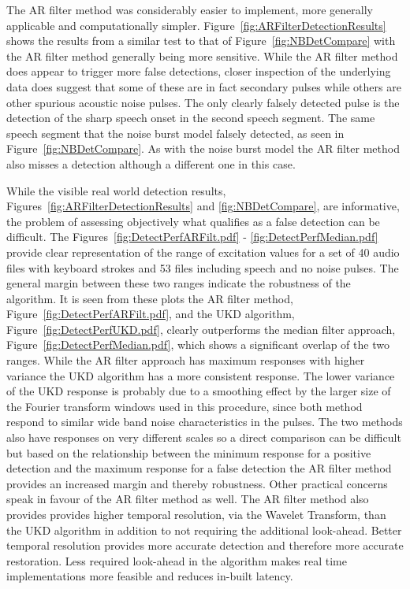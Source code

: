 The AR filter method was considerably easier to implement, more generally applicable and computationally simpler. Figure~\ref{fig:ARFilterDetectionResults} shows the results from a similar test to that of Figure~\ref{fig:NBDetCompare} with the AR filter method generally being more sensitive. While the AR filter method does appear to trigger more false detections, closer inspection of the underlying data does suggest that some of these are in fact secondary pulses while others are other spurious acoustic noise pulses. The only clearly falsely detected pulse is the detection of the sharp speech onset in the second speech segment. The same speech segment that the noise burst model falsely detected, as seen in Figure~\ref{fig:NBDetCompare}. As with the noise burst model the AR filter method also misses a detection although a different one in this case.

While the visible real world detection results, Figures~\ref{fig:ARFilterDetectionResults} and \ref{fig:NBDetCompare}, are informative, the problem of assessing objectively what qualifies as a false detection can be difficult. The Figures~\ref{fig:DetectPerfARFilt.pdf} - \ref{fig:DetectPerfMedian.pdf} provide clear representation of the range of excitation values for a set of 40 audio files with keyboard strokes and 53 files including speech and no noise pulses. The general margin between these two ranges indicate the robustness of the algorithm. It is seen from these plots the AR filter method, Figure~\ref{fig:DetectPerfARFilt.pdf}, and the UKD algorithm, Figure~\ref{fig:DetectPerfUKD.pdf}, clearly outperforms the median filter approach, Figure~\ref{fig:DetectPerfMedian.pdf}, which shows a significant overlap of the two ranges. While the AR filter approach has maximum responses with higher variance the UKD algorithm has a more consistent response. The lower variance of the UKD response is probably due to a smoothing effect by the larger size of the Fourier transform windows used in this procedure, since both method respond to similar wide band noise characteristics in the pulses. The two methods also have responses on very different scales so a direct comparison can be difficult but based on the relationship between the minimum response for a positive detection and the maximum response for a false detection the AR filter method provides an increased margin and thereby robustness. Other practical concerns speak in favour of the AR filter method as well. The AR filter method also provides provides higher temporal resolution, via the Wavelet Transform, than the UKD algorithm in addition to not requiring the additional look-ahead. Better temporal resolution provides more accurate detection and therefore more accurate restoration. Less required look-ahead in the algorithm makes real time implementations more feasible and reduces in-built latency.


